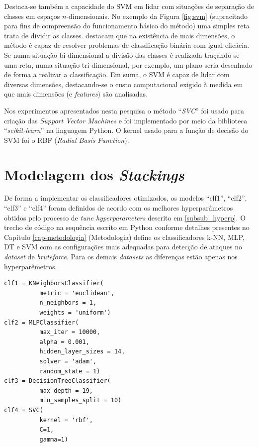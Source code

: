 Destaca-se também a capacidade do SVM em lidar com situações de separação de classes em espaços $n$-dimensionais. No exemplo da Figura \ref{fig:svm} (supracitado para fins de compreensão do funcionamento básico do método) uma simples reta trata de dividir as classes.  destacam que na existência de mais dimensões, o método é capaz de resolver problemas de classificação binária com igual eficácia. Se numa situação bi-dimensional a divisão das classes é realizada traçando-se uma reta, numa situação tri-dimensional, por exemplo, um plano seria desenhado de forma a realizar a classificação. Em suma, o SVM é capaz de lidar com diversas dimensões, destacando-se o custo computacional exigido à medida em que mais dimensões (e \textit{features}) são analisadas.



Nos experimentos apresentados nesta pesquisa o método ``\textit{SVC}'' foi usado para criação das \textit{Support Vector Machines} e foi implementado por meio da biblioteca ``\textit{scikit-learn}'' na linguagem Python. O kernel usado para a função de decisão do SVM foi o RBF (\textit{Radial Basis Function}).











\section{Modelagem dos \textit{Stackings}}
\label{modelagem-Stackings}
De forma a implementar os classificadores otimizados, os modelos ``clf1'', ``clf2'', ``clf3'' e ``clf4'' foram definidos de acordo com os melhores hyperparâmetros obtidos pelo processo de \textit{tune hyperparameters} descrito em \ref{subsub_hyperp}. O trecho de código na sequência escrito em Python conforme detalhes presentes no Capítulo \ref{cap-metodologia} (Metodologia) define os classificadores k-NN, MLP, DT e SVM com as configurações mais adequadas para detecção de ataques no \textit{dataset} de \textit{bruteforce}. Para os demais \textit{datasets} as diferenças estão apenas nos hyperparêmetros.

\begin{verbatim}
clf1 = KNeighborsClassifier(
          metric = 'euclidean', 
          n_neighbors = 1, 
          weights = 'uniform')
clf2 = MLPClassifier(
          max_iter = 10000,
          alpha = 0.001,
          hidden_layer_sizes = 14,
          solver = 'adam',
          random_state = 1)
clf3 = DecisionTreeClassifier(
          max_depth = 19,
          min_samples_split = 10)
clf4 = SVC(
          kernel = 'rbf',
          C=1,
          gamma=1)


\end{verbatim}



